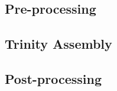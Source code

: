 \documentclass{article}
\begin{document}
\subsection*{Pre-processing}


\subsection*{Trinity Assembly}

\subsection*{Post-processing}


\end{document}
